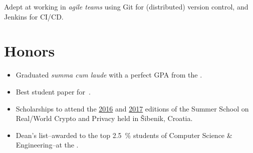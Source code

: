 \documentclass[%
version=last,%
fontsize=11pt,%
paper=A4,%
areasetadvanced,%
headinclude=false,%
footinclude=false,%
headlines=0,%
footlines=0,%
toc=bibnumbered,%
]{scrartcl}
\begin{document}
\begin{minipage}[t]{.4\textwidth}
  \begingroup%
  \small%
  Adept at working in \emph{agile teams} using Git for (distributed) version
  control, and Jenkins for CI/CD\@.\par%
  \endgroup%

  \section{Honors}%
  \label{sec:honors}

  \begin{itemize}[leftmargin=*]
  \item Graduated \emph{summa cum laude} with a perfect GPA from the
    .
  \item Best student paper
    for~\autocite{Gjorgjevski:Combining_LWE-Solving_Algorithms}.
  \item Scholarships to attend the
    \href{http://summerschool-croatia.cs.ru.nl/2016/}{2016} and
    \href{http://summerschool-croatia.cs.ru.nl/2017/}{2017} editions of the
    Summer School on Real\-/World Crypto and Privacy held in Šibenik, Croatia.
  \item Dean’s list\---awarded to the top \SI{2.5}{\percent} students of
    Computer Science \& Engineering\---at the .
  \end{itemize}
\end{minipage}
\end{document}
